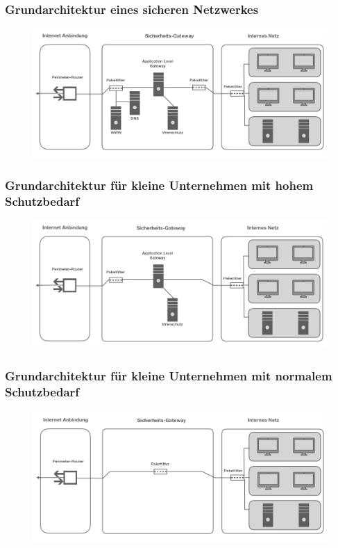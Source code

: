 \documentclass[hyperref={pdfpagelabels=false},xcolor=dvipsnames]{beamer}
\begin{document}
\begin{frame}
	\frametitle{Grundarchitektur eines sicheren Netzwerkes}
	\begin{figure}
	\includegraphics[width=\textwidth]{grundarchitektur.jpeg}	
	\end{figure}
		
\end{frame}
\begin{frame}

	\frametitle{Grundarchitektur für kleine Unternehmen mit hohem Schutzbedarf}
	
	\begin{figure}
	\includegraphics[width=\textwidth]{klUnternehmnorm}	
	\end{figure}
		
\end{frame}


\begin{frame}

	\frametitle{Grundarchitektur für kleine Unternehmen mit normalem Schutzbedarf}
	
	\begin{figure}
	\includegraphics[width=\textwidth]{klUnternHoch}	
	\end{figure}
		
\end{frame}
\end{document}
